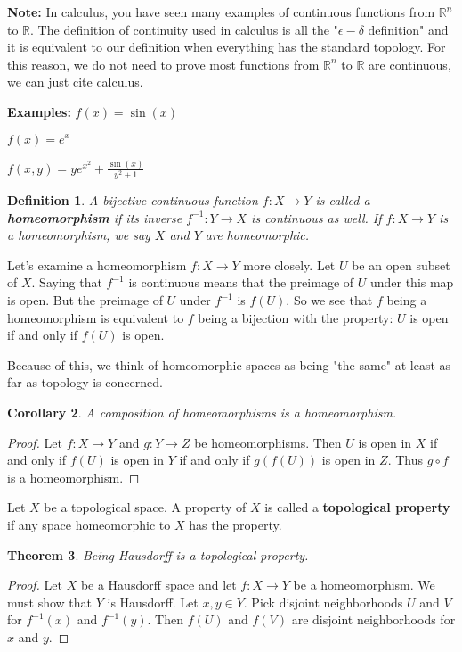 \documentclass[a4paper]{article}
\newtheorem{theorem}{Theorem}
\newtheorem{definition}[theorem]{Definition}
\newtheorem{corollary}[theorem]{Corollary}
\numberwithin{theorem}{section}
\begin{document}
\textbf{Note:} In calculus, you have seen many examples of continuous functions from $\mathbb{R}^n$ to $\mathbb{R}$. The definition of continuity used in calculus is all the "$\epsilon-\delta$ definition" and it is equivalent to our definition when everything has the standard topology. For this reason, we do not need to prove most functions from $\mathbb{R}^n$ to $\mathbb{R}$ are continuous, we can just cite calculus.
 
\textbf{Examples:} $f(x) = \sin (x)$

$f(x) = e^x$

$f(x,y) = ye^{x^2} + \frac{\sin (x)}{y^2 + 1}$

\begin{definition}
A bijective continuous function $f: X \rightarrow Y$ is called a \textbf{homeomorphism} if its inverse $f^{-1}: Y \rightarrow X$ is continuous as well. If $f: X \rightarrow Y$ is a homeomorphism, we say $X$ and $Y$ are homeomorphic.
\end{definition}

Let's examine a homeomorphism $f: X \rightarrow Y$ more closely. Let $U$ be an open subset of $X$. Saying that $f^{-1}$ is continuous means that the preimage of $U$ under this map is open. But the preimage of $U$ under $f^{-1}$ is $f(U)$. So we see that $f$ being a homeomorphism is equivalent to $f$ being a bijection with the property: $U$ is open if and only if $f(U)$ is open.

Because of this, we think of homeomorphic spaces as being "the same" at least as far as topology is concerned.

\begin{corollary}
A composition of homeomorphisms is a homeomorphism.
\end{corollary}
\begin{proof}
Let $f: X \rightarrow Y$ and $g: Y \rightarrow Z$ be homeomorphisms. Then $U$ is open in $X$ if and only if $f(U)$ is open in $Y$ if and only if $g(f(U))$ is open in $Z$. Thus $g \circ f$ is a homeomorphism.

\end{proof}

Let $X$ be a topological space. A property of $X$ is called a \textbf{topological property} if any space homeomorphic to $X$ has the property.

\begin{theorem}
Being Hausdorff is a topological property.
\end{theorem}

\begin{proof}
Let $X$ be a Hausdorff space and let $f: X \rightarrow Y$ be a homeomorphism. We must show that $Y$ is Hausdorff. Let $x,y \in Y$. Pick disjoint neighborhoods $U$ and $V$ for $f^{-1}(x)$ and $f^{-1}(y)$. Then $f(U)$ and $f(V)$ are disjoint neighborhoods for $x$ and $y$.
\end{proof}
\end{document}
